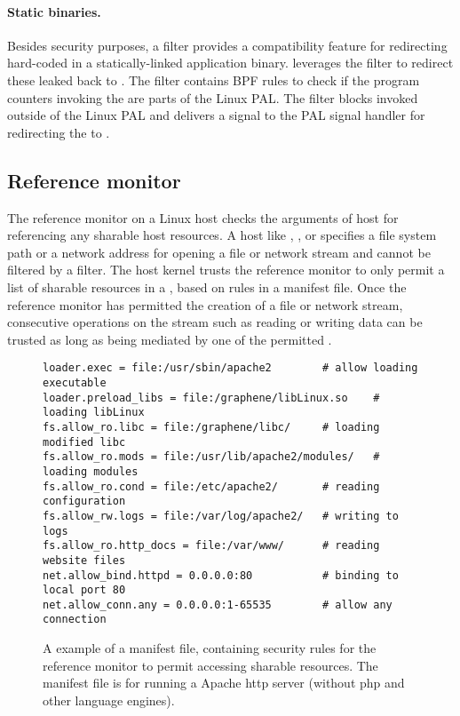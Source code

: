 \paragraph{Static binaries.}
Besides security purposes,
a \seccomp{} filter provides a compatibility feature
for redirecting hard-coded \linuxapis{}
in a statically-linked application binary.
\graphene{} leverages the \seccomp{} filter to redirect these leaked \linuxapis{}
back to \thelibos{}. 
The filter contains BPF rules to check if the program counters
invoking the \linuxapis{}
are parts of the Linux PAL.
The filter blocks \linuxapi{} invoked outside of the Linux PAL
and delivers a  signal
to the PAL signal handler for redirecting the \linuxapis{} to \thelibos{}.



\subsection{Reference monitor}
\label{sec:linux:security:ref-monitor}

The reference monitor on a Linux host
checks the arguments of host \linuxapis{} for referencing any sharable host resources.
A host \linuxapi{} like , , or 
specifies a file system path or a network address
for opening a file or network stream and cannot be filtered by a \seccomp{} filter.
The host kernel trusts the reference monitor
to only permit
a list of sharable resources in a \picoproc{},
based on
rules in a manifest file.
Once the reference monitor has permitted the creation of a file or network stream,
consecutive operations on the stream
such as reading or writing data can be trusted
as long as being mediated by one of the permitted \linuxapis{}.


\begin{figure}
\centering
\begin{lstlisting}
loader.exec = file:/usr/sbin/apache2        # allow loading executable 
loader.preload_libs = file:/graphene/libLinux.so    # loading libLinux
fs.allow_ro.libc = file:/graphene/libc/     # loading modified libc
fs.allow_ro.mods = file:/usr/lib/apache2/modules/   # loading modules
fs.allow_ro.cond = file:/etc/apache2/       # reading configuration
fs.allow_rw.logs = file:/var/log/apache2/   # writing to logs
fs.allow_ro.http_docs = file:/var/www/      # reading website files
net.allow_bind.httpd = 0.0.0.0:80           # binding to local port 80
net.allow_conn.any = 0.0.0.0:1-65535        # allow any connection
\end{lstlisting}
\caption{A example of a manifest file, containing security rules for the reference monitor to permit accessing sharable resources. The manifest file is for running a Apache http server (without php and other language engines).}
\label{fig:linux:manifest-example}
\end{figure}


